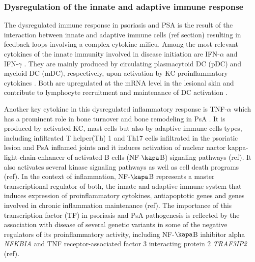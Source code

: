 \subsubsection{Dysregulation of the innate and adaptive immune response}
The dysregulated  immune response in psoriasis and PSA is the result of the interaction between innate and adaptive immune cells (ref section) resulting in feedback loops involving a complex cytokine milieu. Among the most relevant cytokines of the innate immunity involved in disease initiation are IFN-$\alpha$ and IFN-$\gamma$ \parencite{Leanne2009}. They are mainly produced by circulating plasmacytoid DC (pDC) and myeloid DC (mDC), respectively, upon activation by KC proinflammatory cytokines \parencite{Perera2012}. Both are upregulated at the mRNA level in the lesional skin and contribute to lymphocyte recruitment and maintenance of DC activation \parencite{Schmid1994}. 

Another key cytokine in this dysregulated inflammatory response is TNF-$\alpha$ which has a prominent role in bone turnover and bone remodeling in PsA \parencite{Mensah2008}. It is produced by activated KC, mast cells but also by adaptive immune cells types, including infiltrated T helper(Th) 1 and Th17 cells infiltrated in the psoriatic lesion and PsA inflamed joints \parencite{Perera2012} and it induces activation of nuclear nactor kappa-light-chain-enhancer of activated B cells (NF-$\kapa$B) signaling pathways (ref). It also activates several kinase signaling pathways as well as cell death programs (ref). In the context of inflammation, NF-$\kapa$B represents a master transcriptional regulator of both, the innate and adaptive immune system that induces expression of proinflammatory cytokines, antiapoptotic genes and genes involved in chronic inflammation maintenance (ref). The importance of this transcription factor (TF) in psoriasis and PsA pathogenesis is reflected by the association with disease of several genetic variants in some of the negative regulators of its proinflammatory activity, including NF-$\kapa$B inhibitor alpha \textit{NFKBIA} and TNF receptor-associated factor 3 interacting protein 2 \textit{TRAF3IP2} (ref).
 
